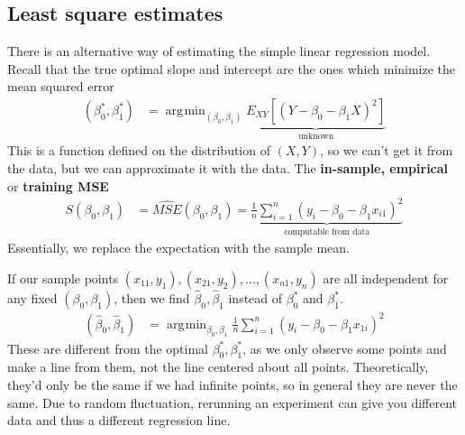 \documentclass[12 pt]{article}
\DeclareMathOperator*{\argmin}{arg\!\min}
\begin{document}
\subsection{Least square estimates}
There is an alternative way of estimating the simple linear regression
model. Recall that the true optimal slope and intercept are the ones
which minimize the mean squared error
\begin{align*}
  (\beta_0^*, \beta_1^*) & = \argmin_{(\beta_0,\beta_1)} \underbrace{E_{XY} [(Y - \beta_0 - \beta_1 X)^2]}_{\text{unknown}}
\end{align*}
This is a function defined on the distribution of $(X,Y)$, so we can't
get it from the data, but we can approximate it with the data. The
\textbf{in-sample, empirical} or \textbf{training MSE}
\begin{align*}
  S(\beta_0, \beta_1) & = \widehat{MSE}(\beta_0, \beta_1) =
                        \underbrace{\frac{1}{n} \sum_{i = 1}^n (y_i -
                        \beta_0 - \beta_1 x_{i1})^2}_{\text{computable
                        from data}}
\end{align*}
Essentially, we replace the expectation with the sample mean.

If our sample points $(x_{11}, y_1), (x_{21}, y_2), \ldots,
(x_{n1},y_n)$ are all independent for any fixed $(\beta_0, \beta_1)$,
then we find $\hat{\beta}_0, \hat{\beta}_1$ instead of $\beta_0^*$
and $\beta_1^*$.
\begin{align*}
  (\hat{\beta}_0, \hat{\beta}_1) & = \argmin_{\beta_0, \beta_1} \frac{1}{n} \sum_{i=1}^n (y_i - \beta_0 - \beta_1 x_{1i})^2
\end{align*}
These are different from the optimal $\beta_0^*, \beta_1^*$, as we
only observe some points and make a line from them, not the line
centered about all points. Theoretically, they'd only be the same if
we had infinite points, so in general they are never the same. Due to
random fluctuation, rerunning an experiment can give you different
data and thus a different regression line.
\end{document}
